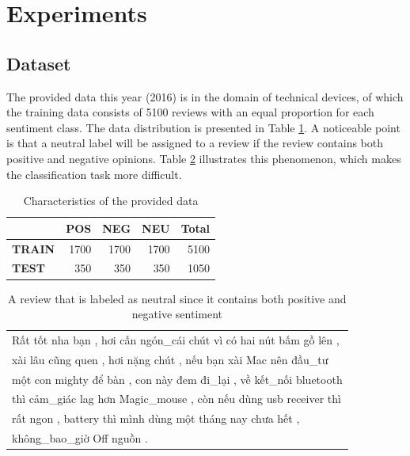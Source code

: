 \documentclass[conference,compsoc]{IEEEtran}
\begin{document}
\section{Experiments}
\subsection{Dataset}
The provided data this year (2016) is in the domain of technical devices, of which the training data consists of 5100 reviews with an equal proportion for each sentiment class. The data distribution is presented in Table \ref{tb-stt}. A noticeable point is that a neutral label will be assigned to a review if the review contains both positive and negative opinions. Table \ref{tb-ex} illustrates this phenomenon, which makes the classification task more difficult.

\begin{table}[t]
\centering
\caption{Characteristics of the provided data}
\label{tb-stt}
\begin{tabular}{l|r|r|r|r}
               & \textbf{POS} & \textbf{NEG} & \textbf{NEU} & \textbf{Total} \\
\hline
\textbf{TRAIN} & 1700         & 1700         & 1700         & 5100           \\
\textbf{TEST}  & 350          & 350          & 350          & 1050          
\end{tabular}
\end{table}

\begin{table}[t]
\centering
\caption{A review that is labeled as neutral since it contains both positive and negative sentiment}
\label{tb-ex}
\begin{tabular}{|l|}
\hline
Rất tốt nha bạn , hơi cấn ngón\_cái chút vì có hai nút bấm gồ lên ,\\xài lâu cũng quen , hơi nặng chút , nếu bạn xài Mac nên đầu\_tư \\một con mighty để bàn , con này đem đi\_lại , về kết\_nối bluetooth\\thì cảm\_giác lag hơn Magic\_mouse , còn nếu dùng usb receiver thì\\ rất ngon , battery thì mình dùng một tháng nay chưa hết ,\\không\_bao\_giờ Off nguồn .\\
\hline
\end{tabular}
\end{table}

\end{document}
